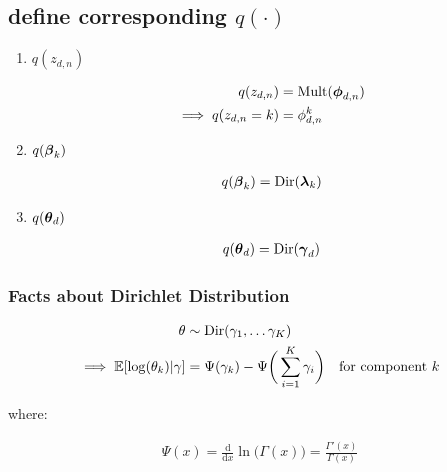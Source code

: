 \documentclass{article}
\begin{document}
\subsection{define corresponding $q(\cdot)$}


\begin{enumerate}
\item $q(z_{d,n})$ 

\begin{equation}\begin{split}
q(z_{d,n}) &= \text{Mult}(\boldsymbol{\phi}_{d,n})\\
\implies q(z_{d,n} = k) &= \phi^k_{d,n}
\end{split}\end{equation}

\item $q(\boldsymbol{\beta}_k) $

\begin{equation}\begin{split}
q(\boldsymbol{\beta}_k) = \text{Dir} (\boldsymbol{\lambda}_k)
\end{split}\end{equation}


\item $q(\boldsymbol{\theta}_d)$

\begin{equation}\begin{split}
q(\boldsymbol{\theta}_d)= \text{Dir}(\boldsymbol{\gamma}_d)
\end{split}\end{equation}


\end{enumerate}

\subsubsection{Facts about Dirichlet Distribution}


\begin{equation}\begin{split}
\theta &\sim \text{Dir} (\gamma_1, \dots \gamma_K)\\ 
\implies  \mathbb{E} [ \log(\theta_k) | \gamma] &=  \Psi(\gamma_k) - \Psi \bigg( \sum_{i=1}^{K}  \gamma_i  \bigg)\quad\text{for component } k
\end{split}\end{equation}

where: 

\begin{equation}\begin{split}
\Psi (x)= \frac {\mathrm {d} }{\mathrm {d} x}\ln \big (\Gamma (x) \big )=\frac {\Gamma '(x)}{\Gamma (x)}
\end{split}\end{equation}
\end{document}
